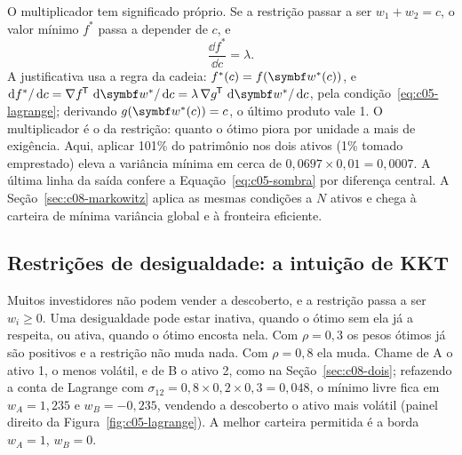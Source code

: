 O multiplicador tem significado próprio. Se a restrição passar a ser $w_1 + w_2 = c$, o valor mínimo $f^{\ast}$ passa a depender de $c$, e
\begin{equation}
  \frac{\dd f^{\ast}}{\dd c} = \lambda .
  \label{eq:c05-sombra}
\end{equation}
A justificativa usa a regra da cadeia: $f^{\ast}(c) = f(\vetor{w}^{\ast}(c))$, e $\dd f^{\ast}/\dd c = \nabla f\T\,\dd\vetor{w}^{\ast}/\dd c = \lambda\,\nabla g\T\,\dd\vetor{w}^{\ast}/\dd c$, pela condição~\eqref{eq:c05-lagrange}; derivando $g(\vetor{w}^{\ast}(c)) = c$, o último produto vale 1. O multiplicador é o  da restrição: quanto o ótimo piora por unidade a mais de exigência. Aqui, aplicar 101\% do patrimônio nos dois ativos (1\% tomado emprestado) eleva a variância mínima em cerca de $0,0697 \times 0,01 = 0,0007$. A última linha da saída confere a Equação~\eqref{eq:c05-sombra} por diferença central. A Seção~\ref{sec:c08-markowitz} aplica as mesmas condições a $N$ ativos e chega à carteira de mínima variância global e à fronteira eficiente.


\subsection{Restrições de desigualdade: a intuição de KKT}
\label{sec:c05-kkt}

Muitos investidores não podem vender a descoberto, e a restrição passa a ser $w_i \ge 0$. Uma desigualdade pode estar inativa, quando o ótimo sem ela já a respeita, ou ativa, quando o ótimo encosta nela. Com $\rho = 0,3$ os pesos ótimos já são positivos e a restrição não muda nada. Com $\rho = 0,8$ ela muda. Chame de A o ativo 1, o menos volátil, e de B o ativo 2, como na Seção~\ref{sec:c08-dois}; refazendo a conta de Lagrange com $\sigma_{12} = 0,8 \times 0,2 \times 0,3 = 0,048$, o mínimo livre fica em $w_A = 1,235$ e $w_B = -0,235$, vendendo a descoberto o ativo mais volátil (painel direito da Figura~\ref{fig:c05-lagrange}). A melhor carteira permitida é a borda $w_A = 1$, $w_B = 0$.

